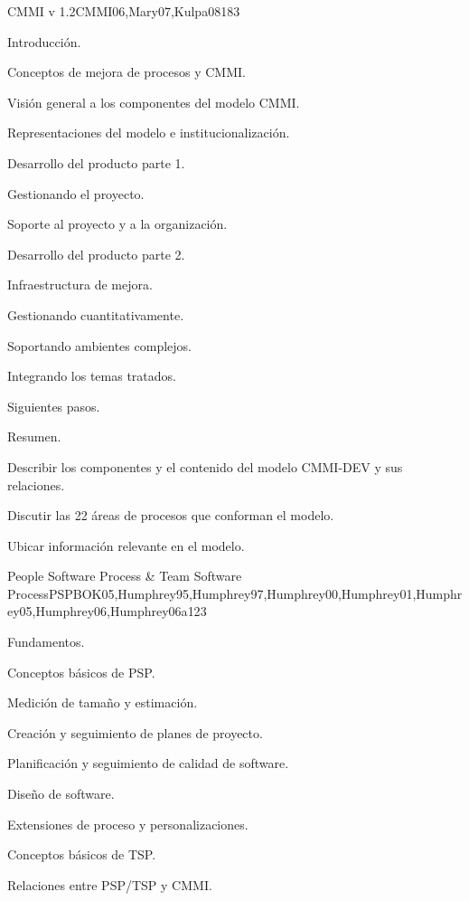 \begin{syllabus}
\begin{unit}{CMMI v 1.2}{CMMI06,Mary07,Kulpa08}{18}{3}
   \begin{topics}
      \item Introducción.
      \item Conceptos de mejora de procesos y CMMI.
      \item Visión general a los componentes del modelo CMMI.
      \item Representaciones del modelo e institucionalización.
      \item Desarrollo del producto parte 1.
      \item Gestionando el proyecto.
      \item Soporte al proyecto y a la organización.
      \item Desarrollo del producto parte 2.
      \item Infraestructura de mejora.
      \item Gestionando cuantitativamente.
      \item Soportando ambientes complejos.
      \item Integrando los temas tratados.
      \item Siguientes pasos.
      \item Resumen.
   \end{topics}

   \begin{learningoutcomes}
      \item Describir los componentes y el contenido del modelo CMMI-DEV y sus relaciones.
      \item Discutir las 22 áreas de procesos que conforman el modelo.
      \item Ubicar información relevante en el modelo.   
   \end{learningoutcomes}
\end{unit}

\begin{unit}{People Software Process \& Team Software Process}{PSPBOK05,Humphrey95,Humphrey97,Humphrey00,Humphrey01,Humphrey05,Humphrey06,Humphrey06a}{12}{3}
\begin{topics}
      \item Fundamentos.
      \item Conceptos básicos de PSP.
      \item Medición de tamaño y estimación.
      \item Creación y seguimiento de planes de proyecto.
      \item Planificación y seguimiento de calidad de software.
      \item Diseño de software.
      \item Extensiones de proceso y personalizaciones.
      \item Conceptos básicos de TSP.
      \item Relaciones entre PSP/TSP y CMMI.
   \end{topics}


\end{unit}
\end{syllabus}
